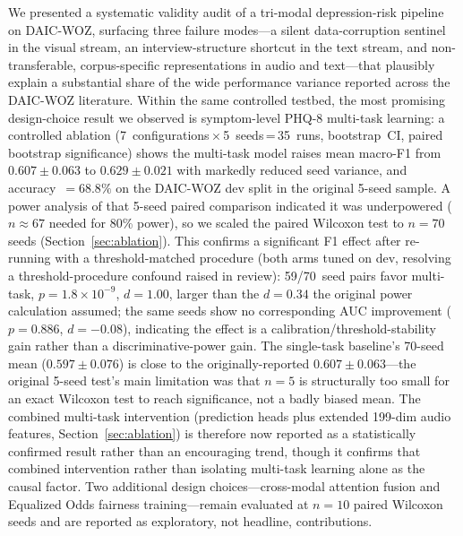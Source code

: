 \documentclass[5p,twocolumn]{elsarticle}
\begin{document}
We presented a systematic validity audit of a tri-modal depression-risk
pipeline on DAIC-WOZ, surfacing three failure modes---a silent
data-corruption sentinel in the visual stream, an interview-structure
shortcut in the text stream, and non-transferable, corpus-specific
representations in audio and text---that plausibly explain a
substantial share of the wide performance variance reported across
the DAIC-WOZ literature. Within the same controlled testbed, the most
promising design-choice result we observed is symptom-level PHQ-8
multi-task learning: a controlled ablation
(7~configurations\,$\times$\,5~seeds\,=\,35~runs, bootstrap~CI,
paired bootstrap significance) shows the multi-task model raises
mean macro-F1 from $0.607\pm0.063$ to $0.629\pm0.021$ with markedly
reduced seed variance, and accuracy~$=68.8\%$ on the DAIC-WOZ dev
split in the original 5-seed sample. A power analysis of that 5-seed
paired comparison indicated it was underpowered
($n{\approx}67$ needed for 80\% power), so we scaled the paired
Wilcoxon test to $n{=}70$ seeds (Section~\ref{sec:ablation}). This
confirms a significant F1 effect after re-running with a
threshold-matched procedure (both arms tuned on dev, resolving a
threshold-procedure confound raised in review): 59/70~seed pairs
favor multi-task, $p{=}1.8{\times}10^{-9}$, $d{=}1.00$, larger than
the $d{=}0.34$ the original power calculation assumed; the same
seeds show no corresponding AUC improvement ($p{=}0.886$,
$d{=}-0.08$), indicating the effect is a calibration/threshold-stability
gain rather than a discriminative-power gain. The
single-task baseline's 70-seed mean ($0.597\pm0.076$) is close to the
originally-reported $0.607\pm0.063$---the original 5-seed test's main
limitation was that $n{=}5$ is structurally too small for an exact
Wilcoxon test to reach significance, not a badly biased mean.
The combined multi-task intervention (prediction heads plus extended
199-dim audio features, Section~\ref{sec:ablation}) is therefore now
reported as a statistically confirmed result rather than an
encouraging trend, though it confirms that combined intervention
rather than isolating multi-task learning alone as the causal factor.
Two additional design choices---cross-modal
attention fusion and Equalized Odds fairness training---remain
evaluated at $n{=}10$ paired Wilcoxon seeds and are reported as
exploratory, not headline, contributions.
\end{document}
